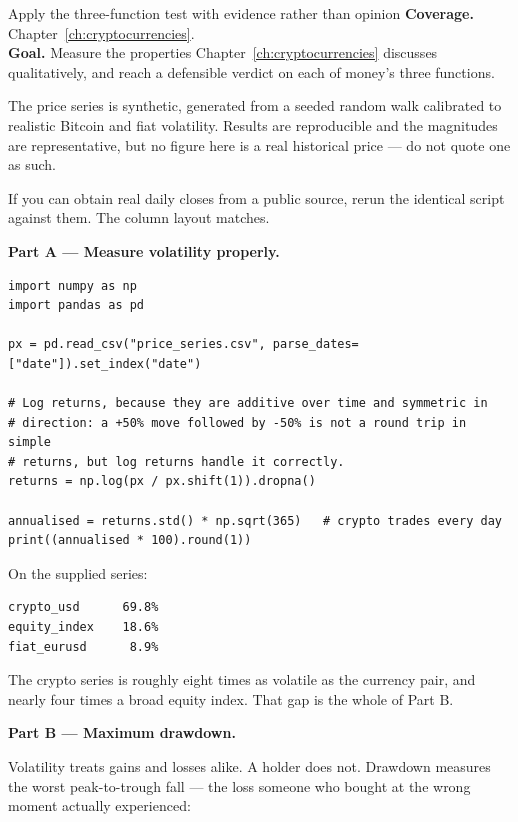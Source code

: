 
\begin{labproject}{Apply the three-function test with evidence rather than opinion}
\textbf{Coverage.} Chapter~\ref{ch:cryptocurrencies}.\\
\textbf{Goal.} Measure the properties Chapter~\ref{ch:cryptocurrencies} discusses qualitatively, and reach a defensible verdict on each of money's three functions.

\begin{labmode}
The price series is synthetic, generated from a seeded random walk calibrated to realistic Bitcoin and fiat volatility. Results are reproducible and the magnitudes are representative, but no figure here is a real historical price --- do not quote one as such.

If you can obtain real daily closes from a public source, rerun the identical script against them. The column layout matches.
\end{labmode}

\medskip\noindent\textbf{Part A --- Measure volatility properly.}\par

\begin{lstlisting}[style=utppython]
import numpy as np
import pandas as pd

px = pd.read_csv("price_series.csv", parse_dates=["date"]).set_index("date")

# Log returns, because they are additive over time and symmetric in
# direction: a +50% move followed by -50% is not a round trip in simple
# returns, but log returns handle it correctly.
returns = np.log(px / px.shift(1)).dropna()

annualised = returns.std() * np.sqrt(365)   # crypto trades every day
print((annualised * 100).round(1))
\end{lstlisting}

On the supplied series:

\begin{lstlisting}[style=utpterminal]
crypto_usd      69.8%
equity_index    18.6%
fiat_eurusd      8.9%
\end{lstlisting}

The crypto series is roughly eight times as volatile as the currency pair, and nearly four times a broad equity index. That gap is the whole of Part B.

\medskip\noindent\textbf{Part B --- Maximum drawdown.}\par
Volatility treats gains and losses alike. A holder does not. Drawdown measures the worst peak-to-trough fall --- the loss someone who bought at the wrong moment actually experienced:


\end{labproject}
